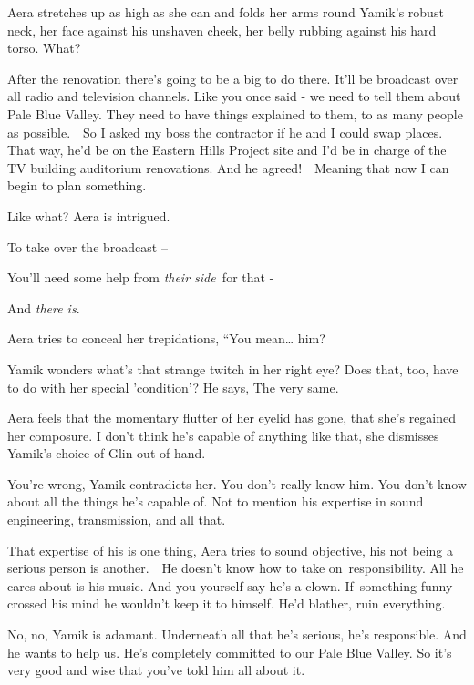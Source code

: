 \documentclass[twoside,11pt]{book}
\begin{document}
Aera stretches up as high as she can and folds her arms round Yamik's robust neck, her face against his unshaven cheek,
her belly rubbing against his hard torso. {\textquotedbl}What?{\textquotedbl} 

{\textquotedbl}After the renovation there's going to be a big to do there. It'll be broadcast over all radio and
television channels. Like you once said - we need to tell them about Pale Blue Valley. They need to have things
explained to them, to as many people as possible.\ \ So I asked my boss the contractor if he and I could swap places.
That way, he'd be on the Eastern Hills Project site and I'd be in charge of the TV building auditorium renovations. And
he agreed!\ \ Meaning that now I can begin to plan something.{\textquotedbl} 

{\textquotedbl}Like what?{\textquotedbl} Aera is intrigued. 

{\textquotedbl}To take over the broadcast --{\textquotedbl} 

{\textquotedbl}You'll need some help from \textit{their side\ }for that -{\textquotedbl} 

{\textquotedbl}And \textit{there is}.{\textquotedbl} 

Aera tries to conceal her trepidations, ``You mean{\dots} him?{\textquotedbl} 

Yamik wonders what's that strange twitch in her right eye? Does that, too, have to do with her special 'condition'? He
says, {\textquotedbl}The very same.{\textquotedbl} 

Aera feels that the momentary flutter of her eyelid has gone, that she's regained her composure. {\textquotedbl}I don't
think he's capable of anything like that,{\textquotedbl} she dismisses Yamik's choice of Glin out of hand. ~

{\textquotedbl}You're wrong,{\textquotedbl} Yamik contradicts her. {\textquotedbl}You don't really know him. You don't
know about all the things he's capable of. Not to mention his expertise in sound engineering, transmission, and all
that.{\textquotedbl} 

{\textquotedbl}That expertise of his is one thing,{\textquotedbl} Aera tries to sound objective, {\textquotedbl}his not
being a serious person is another.\ \ He doesn't know how to take on~responsibility. All he cares about is his music.
And you yourself say he's a clown. If~something funny crossed his mind he wouldn't keep it to himself. He'd blather,
ruin everything.{\textquotedbl} 

{\textquotedbl}No, no,{\textquotedbl} Yamik is adamant. {\textquotedbl}Underneath all that he's serious, he's
responsible. And he wants to help us. He's completely committed to our Pale Blue Valley. So it's very good and wise
that you've told him all about it.{\textquotedbl} 
\end{document}
